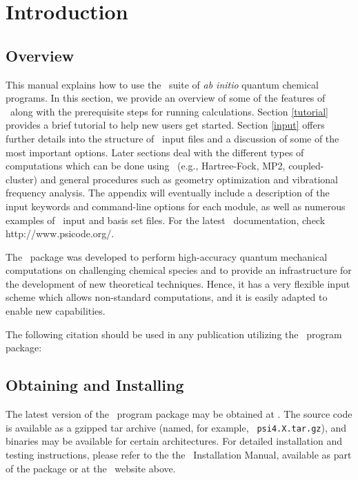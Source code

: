 \section{Introduction} \label{introduction}

\subsection{Overview} 

This manual explains how to use the \PSIfour\ suite of {\em ab initio}
quantum chemical programs.  In this section, we provide an overview of
some of the features of \PSIfour\ along with the prerequisite steps for
running calculations.  Section \ref{tutorial} provides a brief tutorial to
help new users get started.  Section \ref{input} offers further details
into the structure of \PSIfour\ input files and a discussion of some of
the most important options.  Later sections deal with the different types
of computations which can be done using \PSIfour\ (e.g., Hartree-Fock,
MP2, coupled-cluster) and general procedures such as geometry optimization
and vibrational frequency analysis.  The appendix will eventually include a
description of the input keywords and command-line options for each module,
as well as numerous examples of \PSIfour\ input and basis set files.
For the latest \PSIfour\ documentation, check  {http://www.psicode.org/}.

The \PSIfour\ package was developed to perform high-accuracy quantum
mechanical computations on challenging chemical species and to provide an
infrastructure for the development of new theoretical techniques.  Hence,
it has a very flexible input scheme which allows non-standard computations,
and it is easily adapted to enable new capabilities.

The following citation should be used in any publication utilizing the
\PSIfour\ program package:

\begin{quotation}
\noindent

\end{quotation}

\subsection{Obtaining and Installing \PSIfour}
\label{installation}

The latest version of the \PSIfour\ program package may be obtained at
.  The
source code is available as a gzipped tar archive (named, for example, {\tt
psi4.X.tar.gz}), and binaries may be available for certain architectures.
For detailed installation and testing instructions, please refer to the
the \PSIfour\ Installation Manual, available as part of the package or
at the \PSIfour\ website above.

